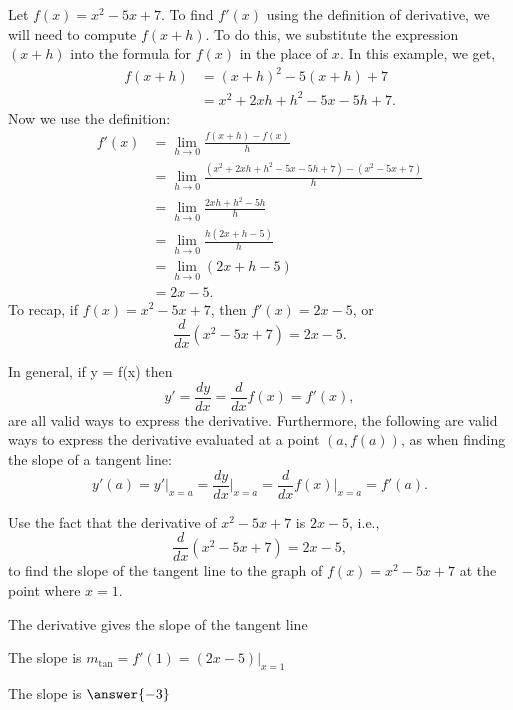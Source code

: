 \documentclass{ximera}
\begin{document}






\begin{example} %
Let $f(x) = x^2 - 5x + 7$.  To find $f'(x)$ using the definition of derivative, we will need to compute $f(x+h)$.
To do this, we substitute the expression $(x+h)$ into the formula for $f(x)$ in the place of $x$.  
In this example, we get,
\begin{align*}
f(x+h) &= (x+h)^2 - 5(x+h) + 7 \\
       &= x^2 + 2xh + h^2 - 5x -5h + 7.			
\end{align*}
Now we use the definition:			
\begin{align*}
f'(x) &= \lim_{h \to 0} \frac{f(x+h)-f(x)}{h} \\[5pt] 
&= \lim_{h \to 0} \frac{(x^2 + 2xh + h^2 - 5x - 5h +7)- (x^2 - 5x + 7)}{h}\\[5pt]
&= \lim_{h \to 0} \frac{ 2xh + h^2 - 5h }{h} \\[5pt]
&= \lim_{h \to 0} \frac{ h(2x + h -5)}{h}\\[5pt]
&= \lim_{h \to 0} (2x + h -5)\\
&= 2x-5.
\end{align*}
To recap, if $f(x) = x^2 - 5x + 7$, then $f'(x) =2x-5$,
or
\[
\frac{d}{dx} (x^2 - 5x + 7) = 2x-5.
\]
\end{example}

In general, if y = f(x) then
\[
y' = \frac{dy}{dx} = \frac{d}{dx} f(x) = f'(x),
\]
are all valid ways to express the derivative.
Furthermore, the following are valid ways to express the derivative evaluated at a point $(a, f(a))$, as when finding the slope of a tangent line:
\[
y'(a) = y' \big|_{x=a} = \frac{dy}{dx}\Big|_{x=a} = \frac{d}{dx} f(x)\Big|_{x=a} = f'(a).
\]



\begin{problem} %
Use the fact that the derivative of $x^2 -5x + 7$ is $2x-5$,
i.e., 
\[
\frac{d}{dx}\left( x^2 - 5x + 7 \right) = 2x-5,
\]
to find the slope of the tangent line to the graph of 
$f(x) = x^2 - 5x + 7$ at the point where $x = 1$.\\
\begin{hint}
The derivative gives the slope of the tangent line
\end{hint}
\begin{hint}
The slope is $m_{\text{tan}} = f'(1) = (2x-5)\big|_{x=1}$
\end{hint}
The slope is $\answer{-3}$
\end{problem}
\end{document}
